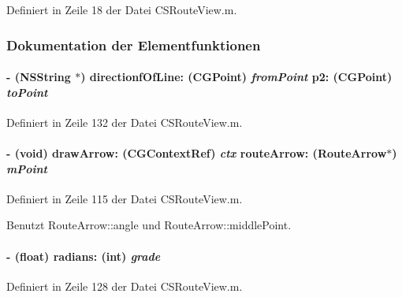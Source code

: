 Definiert in Zeile 18 der Datei CSRouteView.m.

\subsubsection{Dokumentation der Elementfunktionen}
\hypertarget{interface_c_s_route_view_internal_a6d37fc46f0fee013405917fd7e74d455}{
\paragraph[{directionfOfLine:p2:}]{\setlength{\rightskip}{0pt plus 5cm}-\/ (NSString $\ast$) directionfOfLine: (CGPoint) {\em fromPoint}\/ p2: (CGPoint) {\em toPoint}}\hfill}
\label{interface_c_s_route_view_internal_a6d37fc46f0fee013405917fd7e74d455}


Definiert in Zeile 132 der Datei CSRouteView.m.\hypertarget{interface_c_s_route_view_internal_a0dfb98537646ea91c04f9b0f34234896}{
\paragraph[{drawArrow:routeArrow:}]{\setlength{\rightskip}{0pt plus 5cm}-\/ (void) drawArrow: (CGContextRef) {\em ctx}\/ routeArrow: ({\bf RouteArrow}$\ast$) {\em mPoint}}\hfill}
\label{interface_c_s_route_view_internal_a0dfb98537646ea91c04f9b0f34234896}


Definiert in Zeile 115 der Datei CSRouteView.m.

Benutzt RouteArrow::angle und RouteArrow::middlePoint.\hypertarget{interface_c_s_route_view_internal_afdb41f6a8d65f8a382d14c4c860e2e24}{
\paragraph[{radians:}]{\setlength{\rightskip}{0pt plus 5cm}-\/ (float) radians: (int) {\em grade}}\hfill}
\label{interface_c_s_route_view_internal_afdb41f6a8d65f8a382d14c4c860e2e24}


Definiert in Zeile 128 der Datei CSRouteView.m.

